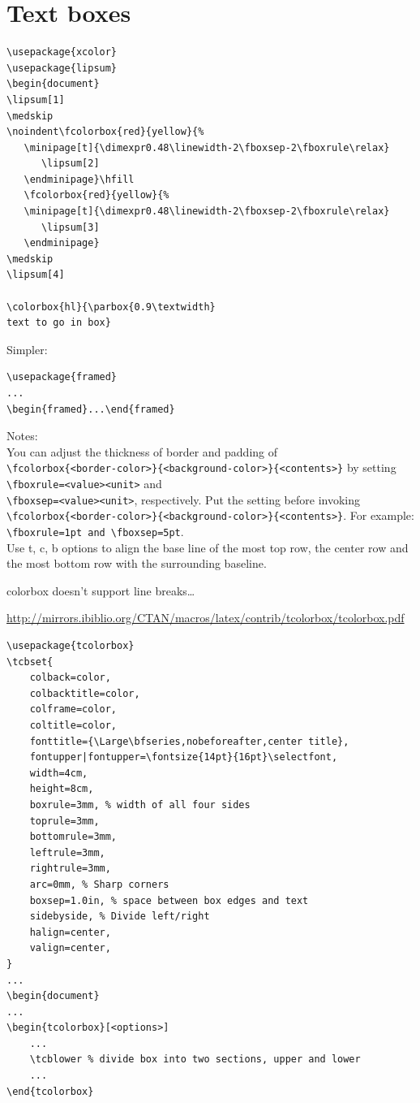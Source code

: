 \documentclass{article}
\begin{document}
\section{Text boxes}
\begin{lstlisting}
\usepackage{xcolor}
\usepackage{lipsum}
\begin{document}
\lipsum[1]
\medskip
\noindent\fcolorbox{red}{yellow}{%
   \minipage[t]{\dimexpr0.48\linewidth-2\fboxsep-2\fboxrule\relax}
      \lipsum[2]
   \endminipage}\hfill
   \fcolorbox{red}{yellow}{%
   \minipage[t]{\dimexpr0.48\linewidth-2\fboxsep-2\fboxrule\relax}
      \lipsum[3]
   \endminipage}
\medskip
\lipsum[4]

\colorbox{hl}{\parbox{0.9\textwidth}
text to go in box}

\end{lstlisting}

Simpler:
\begin{lstlisting}
\usepackage{framed}
...
\begin{framed}...\end{framed}
\end{lstlisting}



Notes:\\
You can adjust the thickness of border and padding of\\
\verb|\fcolorbox{<border-color>}{<background-color>}{<contents>}|
by setting\\
\verb|\fboxrule=<value><unit>| and\\
\verb|\fboxsep=<value><unit>|, respectively. Put the setting
before invoking\\
\verb|\fcolorbox{<border-color>}{<background-color>}{<contents>}|.
For example:\\
\verb|\fboxrule=1pt and \fboxsep=5pt|.\\
Use \textrm{t}, \textrm{c}, \textrm{b}
options to align the base line of the most top row,
the center row and the most bottom row with the surrounding baseline.

colorbox doesn't support line breaks\ldots

\url{http://mirrors.ibiblio.org/CTAN/macros/latex/contrib/tcolorbox/tcolorbox.pdf}
\begin{lstlisting}
\usepackage{tcolorbox}
\tcbset{
    colback=color,
    colbacktitle=color,
    colframe=color,
    coltitle=color,
    fonttitle={\Large\bfseries,nobeforeafter,center title},
    fontupper|fontupper=\fontsize{14pt}{16pt}\selectfont,
    width=4cm,
    height=8cm,
    boxrule=3mm, % width of all four sides
    toprule=3mm,
    bottomrule=3mm,
    leftrule=3mm,
    rightrule=3mm,
    arc=0mm, % Sharp corners
    boxsep=1.0in, % space between box edges and text
    sidebyside, % Divide left/right
    halign=center,
    valign=center,
}
...
\begin{document}
...
\begin{tcolorbox}[<options>]
    ...
    \tcblower % divide box into two sections, upper and lower
    ...
\end{tcolorbox}
\end{lstlisting}
\end{document}

